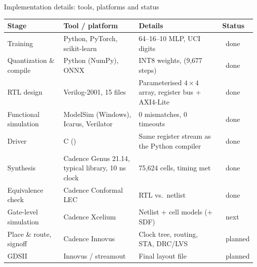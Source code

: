 \documentclass[aspectratio=169,10pt,t]{beamer}
\newcommand{\py}[1]{\texttt{\detokenize{#1}}}
\newcommand{\ok}{\textcolor{good}{\ding{51}}}
\newcommand{\todo}{\textcolor{orange}{\ding{109}}}
\newcommand{\pend}{\textcolor{midgrey}{\ding{109}}}
\begin{document}
\begin{frame}{Implementation details: tools, platforms and status}
  \footnotesize
  \renewcommand{\arraystretch}{1.18}
  \begin{tabularx}{\textwidth}{@{}p{3.1cm}p{4.7cm}Xp{1.6cm}@{}}
    \toprule
    \textbf{Stage} & \textbf{Tool / platform} & \textbf{Details} & \textbf{Status}\\
    \midrule
    Training & Python, PyTorch, scikit-learn & 64--16--10 MLP, UCI digits & \ok\ done\\
    Quantization \& compile & Python (NumPy), ONNX & INT8 weights, \py{prog.hex} (9,677 steps) & \ok\ done\\
    RTL design & Verilog-2001, 15 files & Parameterised $4{\times}4$ array, register bus + AXI4-Lite & \ok\ done\\
    Functional simulation & ModelSim (Windows), Icarus, Verilator & 0 mismatches, 0 timeouts & \ok\ done\\
    Driver & C (\py{driver/}) & Same register stream as the Python compiler & \ok\ done\\
    Synthesis & Cadence Genus 21.14, typical library, 10 ns clock & 75,624 cells, timing met & \ok\ done\\
    Equivalence check & Cadence Conformal LEC & RTL vs.\ netlist & \ok\ done\\
    Gate-level simulation & Cadence Xcelium & Netlist + cell models (+ SDF) & \todo\ next\\
    Place \& route, signoff & Cadence Innovus & Clock tree, routing, STA, DRC/LVS & \pend\ planned\\
    GDSII & Innovus / streamout & Final layout file & \pend\ planned\\
    \bottomrule
  \end{tabularx}
\end{frame}
\end{document}
